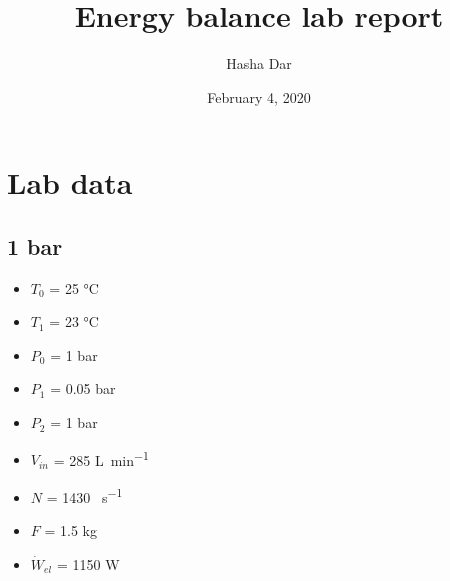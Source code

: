 \documentclass[class=article, crop=false, 12pt,a4paper]{standalone}
\numberwithin{equation}{section}
\begin{document}
\title{Energy balance lab report}
\author{Hasha Dar}
\date{February 4, 2020}
\maketitle
\tableofcontents
\newpage
\section{Lab data}
\subsection{1 bar}
\begin{multicols}{2}
  \begin{itemize}[noitemsep]
    \item \(T_0\) = 25 \si{\celsius}
    \item \(T_1\) = 23 \si{\celsius}
    \item \(P_0\) = 1 \si{bar}
    \item \(P_1\) = 0.05 \si{bar}
    \item \(P_2\) = 1 \si{\bar}
    \item \(V_{in}\) = 285 \si{\liter\per\minute}
    \item \(N\) = 1430 \si{\rev\per\second}
    \item \(F\) = 1.5 \si{\kg}
    \item \(\dot{W}_{el}\) = 1150 \si{\watt}
  \end{itemize}
\end{multicols}
\end{document}

